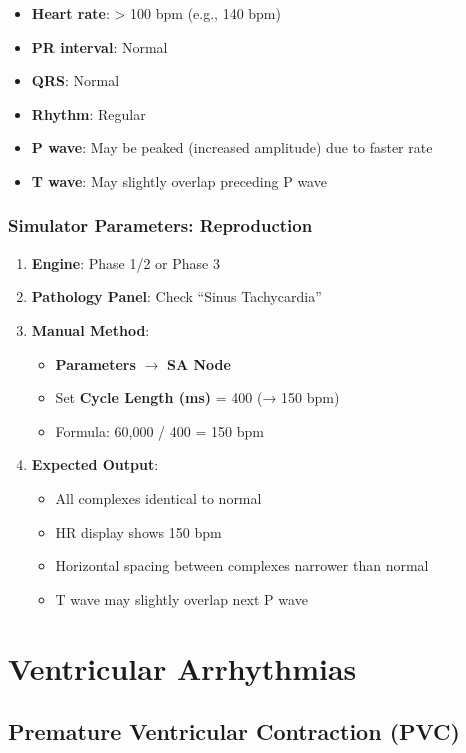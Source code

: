 \documentclass[12pt,a4paper,oneside]{book}
\begin{document}
\begin{itemize}
    \item \textbf{Heart rate}: > 100 bpm (e.g., 140 bpm)
    \item \textbf{PR interval}: Normal
    \item \textbf{QRS}: Normal
    \item \textbf{Rhythm}: Regular
    \item \textbf{P wave}: May be peaked (increased amplitude) due to faster rate
    \item \textbf{T wave}: May slightly overlap preceding P wave
\end{itemize}

\subsubsection{Simulator Parameters: Reproduction}

\begin{enumerate}
    \item \textbf{Engine}: Phase 1/2 or Phase 3
    \item \textbf{Pathology Panel}: Check ``Sinus Tachycardia''
    \item \textbf{Manual Method}:
    \begin{itemize}
        \item \textbf{Parameters} $\to$ \textbf{SA Node}
        \item Set \textbf{Cycle Length (ms)} = 400 (→ 150 bpm)
        \item Formula: 60,000 / 400 = 150 bpm
    \end{itemize}
    \item \textbf{Expected Output}:
    \begin{itemize}
        \item All complexes identical to normal
        \item HR display shows 150 bpm
        \item Horizontal spacing between complexes narrower than normal
        \item T wave may slightly overlap next P wave
    \end{itemize}
\end{enumerate}

\section{Ventricular Arrhythmias}

\subsection{Premature Ventricular Contraction (PVC)}
\end{document}
